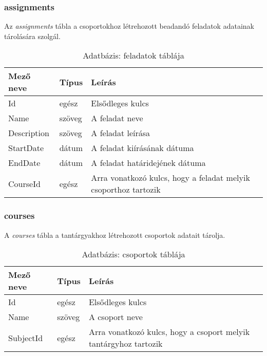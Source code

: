 \subsubsection{assignments}
Az \emph{assignments} tábla a csoportokhoz létrehozott beadandó feladatok adatainak tárolására szolgál.
\begin{table}[H]
	\centering
	\begin{tabular}{ | m{} | m{} | m{} | }
		\hline
		\textbf{Mező neve} & \textbf{Típus} & \textbf{Leírás} \\
		\hline \hline
		Id & egész & Elsődleges kulcs \\
		\hline
		Name & szöveg & A feladat neve \\
		\hline
		Description & szöveg & A feladat leírása \\
		\hline
		StartDate & dátum & A feladat kiírásának dátuma \\
		\hline
		EndDate & dátum & A feladat határidejének dátuma \\
		\hline
		CourseId & egész & Arra vonatkozó kulcs, hogy a feladat melyik csoporthoz tartozik \\
		\hline
	\end{tabular}
	\caption{Adatbázis: feladatok táblája}
	\label{tab:db-assignments}
\end{table}
\subsubsection{courses}
A \emph{courses} tábla a tantárgyakhoz létrehozott csoportok adatait tárolja.
\begin{table}[H]
	\centering
	\begin{tabular}{ | m{} | m{} | m{} | }
		\hline
		\textbf{Mező neve} & \textbf{Típus} & \textbf{Leírás} \\
		\hline \hline
		Id & egész & Elsődleges kulcs \\
		\hline
		Name & szöveg & A csoport neve \\
		\hline
		SubjectId & egész & Arra vonatkozó kulcs, hogy a csoport melyik tantárgyhoz tartozik \\
		\hline
	\end{tabular}
	\caption{Adatbázis: csoportok táblája}
	\label{tab:db-courses}
\end{table}

